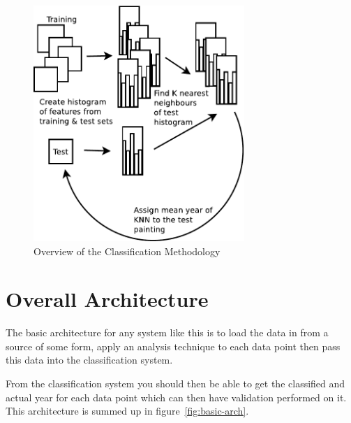 \begin{figure}[h]
\centering
\includegraphics[width=8cm]{img/kyffin_overview.pdf}
\caption{Overview of the Classification Methodology}
\label{img:classification-overview}
\end{figure}


\section{Overall Architecture}
The basic architecture for any system like this is to load the data in from a source of some form,
apply an analysis technique to each data point then pass this data into the classification system.

From the classification system you should then be able to get the classified and actual year for
each data point which can then have validation performed on it. This architecture is summed up in
figure~\ref{fig:basic-arch}.


